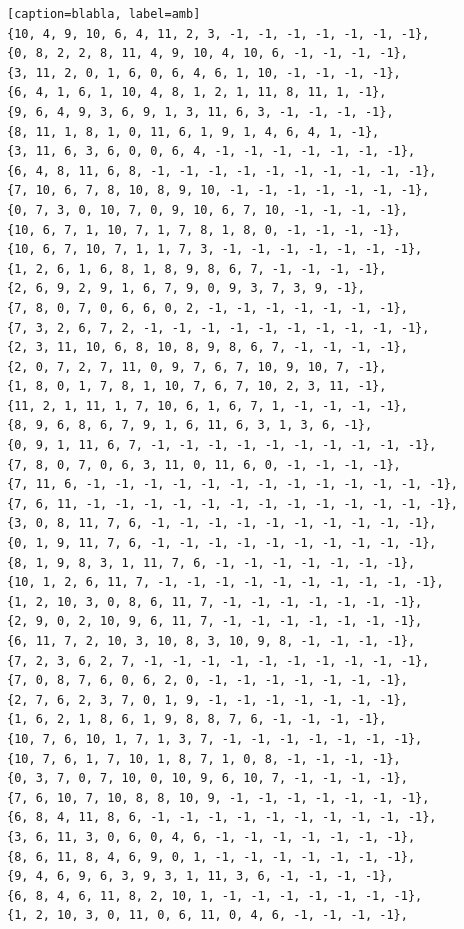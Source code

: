 \documentclass[12pt]{article}
\begin{document}
\begin{lstlisting}[frame=single, basicstyle=\scriptsize][caption=blabla, label=amb]
{10, 4, 9, 10, 6, 4, 11, 2, 3, -1, -1, -1, -1, -1, -1, -1},
{0, 8, 2, 2, 8, 11, 4, 9, 10, 4, 10, 6, -1, -1, -1, -1},
{3, 11, 2, 0, 1, 6, 0, 6, 4, 6, 1, 10, -1, -1, -1, -1},
{6, 4, 1, 6, 1, 10, 4, 8, 1, 2, 1, 11, 8, 11, 1, -1},
{9, 6, 4, 9, 3, 6, 9, 1, 3, 11, 6, 3, -1, -1, -1, -1},
{8, 11, 1, 8, 1, 0, 11, 6, 1, 9, 1, 4, 6, 4, 1, -1},
{3, 11, 6, 3, 6, 0, 0, 6, 4, -1, -1, -1, -1, -1, -1, -1},
{6, 4, 8, 11, 6, 8, -1, -1, -1, -1, -1, -1, -1, -1, -1, -1},
{7, 10, 6, 7, 8, 10, 8, 9, 10, -1, -1, -1, -1, -1, -1, -1},
{0, 7, 3, 0, 10, 7, 0, 9, 10, 6, 7, 10, -1, -1, -1, -1},
{10, 6, 7, 1, 10, 7, 1, 7, 8, 1, 8, 0, -1, -1, -1, -1},
{10, 6, 7, 10, 7, 1, 1, 7, 3, -1, -1, -1, -1, -1, -1, -1},
{1, 2, 6, 1, 6, 8, 1, 8, 9, 8, 6, 7, -1, -1, -1, -1},
{2, 6, 9, 2, 9, 1, 6, 7, 9, 0, 9, 3, 7, 3, 9, -1},
{7, 8, 0, 7, 0, 6, 6, 0, 2, -1, -1, -1, -1, -1, -1, -1},
{7, 3, 2, 6, 7, 2, -1, -1, -1, -1, -1, -1, -1, -1, -1, -1},
{2, 3, 11, 10, 6, 8, 10, 8, 9, 8, 6, 7, -1, -1, -1, -1},
{2, 0, 7, 2, 7, 11, 0, 9, 7, 6, 7, 10, 9, 10, 7, -1},
{1, 8, 0, 1, 7, 8, 1, 10, 7, 6, 7, 10, 2, 3, 11, -1},
{11, 2, 1, 11, 1, 7, 10, 6, 1, 6, 7, 1, -1, -1, -1, -1},
{8, 9, 6, 8, 6, 7, 9, 1, 6, 11, 6, 3, 1, 3, 6, -1},
{0, 9, 1, 11, 6, 7, -1, -1, -1, -1, -1, -1, -1, -1, -1, -1},
{7, 8, 0, 7, 0, 6, 3, 11, 0, 11, 6, 0, -1, -1, -1, -1},
{7, 11, 6, -1, -1, -1, -1, -1, -1, -1, -1, -1, -1, -1, -1, -1},
{7, 6, 11, -1, -1, -1, -1, -1, -1, -1, -1, -1, -1, -1, -1, -1},
{3, 0, 8, 11, 7, 6, -1, -1, -1, -1, -1, -1, -1, -1, -1, -1},
{0, 1, 9, 11, 7, 6, -1, -1, -1, -1, -1, -1, -1, -1, -1, -1},
{8, 1, 9, 8, 3, 1, 11, 7, 6, -1, -1, -1, -1, -1, -1, -1},
{10, 1, 2, 6, 11, 7, -1, -1, -1, -1, -1, -1, -1, -1, -1, -1},
{1, 2, 10, 3, 0, 8, 6, 11, 7, -1, -1, -1, -1, -1, -1, -1},
{2, 9, 0, 2, 10, 9, 6, 11, 7, -1, -1, -1, -1, -1, -1, -1},
{6, 11, 7, 2, 10, 3, 10, 8, 3, 10, 9, 8, -1, -1, -1, -1},
{7, 2, 3, 6, 2, 7, -1, -1, -1, -1, -1, -1, -1, -1, -1, -1},
{7, 0, 8, 7, 6, 0, 6, 2, 0, -1, -1, -1, -1, -1, -1, -1},
{2, 7, 6, 2, 3, 7, 0, 1, 9, -1, -1, -1, -1, -1, -1, -1},
{1, 6, 2, 1, 8, 6, 1, 9, 8, 8, 7, 6, -1, -1, -1, -1},
{10, 7, 6, 10, 1, 7, 1, 3, 7, -1, -1, -1, -1, -1, -1, -1},
{10, 7, 6, 1, 7, 10, 1, 8, 7, 1, 0, 8, -1, -1, -1, -1},
{0, 3, 7, 0, 7, 10, 0, 10, 9, 6, 10, 7, -1, -1, -1, -1},
{7, 6, 10, 7, 10, 8, 8, 10, 9, -1, -1, -1, -1, -1, -1, -1},
{6, 8, 4, 11, 8, 6, -1, -1, -1, -1, -1, -1, -1, -1, -1, -1},
{3, 6, 11, 3, 0, 6, 0, 4, 6, -1, -1, -1, -1, -1, -1, -1},
{8, 6, 11, 8, 4, 6, 9, 0, 1, -1, -1, -1, -1, -1, -1, -1},
{9, 4, 6, 9, 6, 3, 9, 3, 1, 11, 3, 6, -1, -1, -1, -1},
{6, 8, 4, 6, 11, 8, 2, 10, 1, -1, -1, -1, -1, -1, -1, -1},
{1, 2, 10, 3, 0, 11, 0, 6, 11, 0, 4, 6, -1, -1, -1, -1},

\end{lstlisting}
\end{document}
